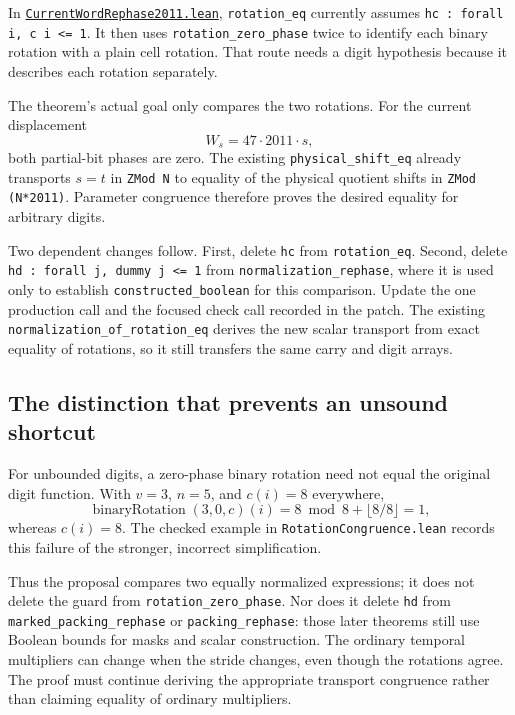 \documentclass[11pt,letterpaper]{article}
\newcommand{\code}[1]{{\small\urlstyle{tt}\nolinkurl{#1}}}
\newcommand{\source}[2]{\href{https://github.com/VladimirReshetnikov/ProveIt/blob/f00ba53b331833c6cb64707bd90e48489e5610f5/#1}{#2}}
\newcommand{\module}[1]{\code{#1.lean}}
\begin{document}
In \source{Computability/DiophantineConsistency/Lean/DiophantineConsistency/CurrentWordRephase2011.lean}{\module{CurrentWordRephase2011}}, \code{rotation_eq} currently assumes
\code{hc : forall i, c i <= 1}. It then uses \code{rotation_zero_phase} twice to identify each binary rotation with a plain cell rotation. That route needs a digit hypothesis because it describes each rotation separately.

The theorem's actual goal only compares the two rotations. For the current displacement
\[
 W_s=47\cdot2011\cdot s,
\]
both partial-bit phases are zero. The existing \code{physical_shift_eq} already transports $s=t$ in \code{ZMod N} to equality of the physical quotient shifts in \code{ZMod (N*2011)}. Parameter congruence therefore proves the desired equality for arbitrary digits.

Two dependent changes follow. First, delete \code{hc} from \code{rotation_eq}. Second, delete \code{hd : forall j, dummy j <= 1} from \code{normalization_rephase}, where it is used only to establish \code{constructed_boolean} for this comparison. Update the one production call and the focused check call recorded in the patch. The existing \code{normalization_of_rotation_eq} derives the new scalar transport from exact equality of rotations, so it still transfers the same carry and digit arrays.

\subsection{The distinction that prevents an unsound shortcut}

For unbounded digits, a zero-phase binary rotation need not equal the original digit function. With $v=3$, $n=5$, and $c(i)=8$ everywhere,
\[
 \operatorname{binaryRotation}(3,0,c)(i)=8\bmod8+\lfloor8/8\rfloor=1,
\]
whereas $c(i)=8$. The checked example in \code{RotationCongruence.lean} records this failure of the stronger, incorrect simplification.

Thus the proposal compares two equally normalized expressions; it does not delete the guard from \code{rotation_zero_phase}. Nor does it delete \code{hd} from \code{marked_packing_rephase} or \code{packing_rephase}: those later theorems still use Boolean bounds for masks and scalar construction. The ordinary temporal multipliers can change when the stride changes, even though the rotations agree. The proof must continue deriving the appropriate transport congruence rather than claiming equality of ordinary multipliers.
\end{document}
